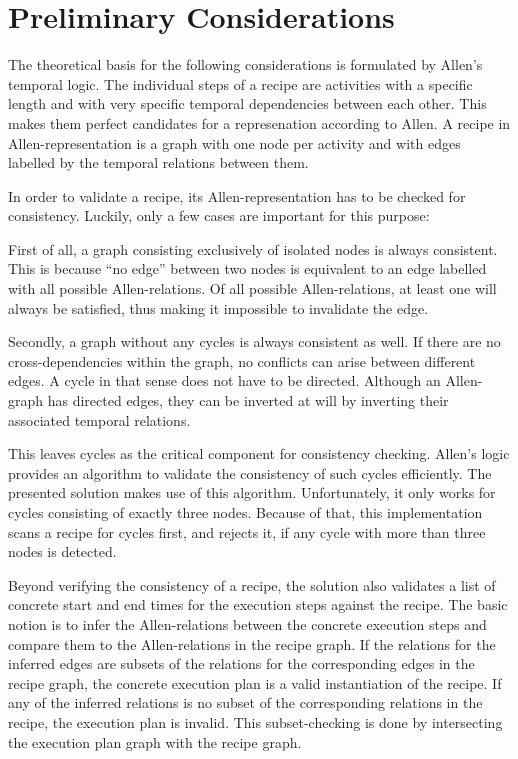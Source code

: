 \chapter{Preliminary Considerations}

    The theoretical basis for the following considerations is formulated
    by Allen's temporal logic. The individual steps of a recipe are activities
    with a specific length and with very specific temporal dependencies between each other. This
    makes them perfect candidates for a represenation according to Allen. A
    recipe in Allen-representation is a graph with one node per activity and with edges
    labelled by the temporal relations between them.
    
    In order to validate a recipe, its Allen-representation has to be checked
    for consistency. Luckily, only a few cases are important for this purpose:
    
    First of all, a graph consisting exclusively of isolated nodes
    is always consistent. This is because ``no edge'' between two nodes is equivalent to
    an edge labelled with all possible Allen-relations. Of all possible
    Allen-relations, at least one will always be satisfied, thus making it
    impossible to invalidate the edge.
    
    Secondly, a graph without any cycles is always consistent as well. If there
    are no cross-dependencies within the graph, no conflicts can arise between
    different edges. A cycle in that sense does not have to be directed.
    Although an Allen-graph has directed edges, they can be inverted at will by
    inverting their associated temporal relations.
    
    This leaves cycles as the critical component for consistency checking.
    Allen's logic provides an algorithm to validate the consistency of such
    cycles efficiently. The presented solution makes use of this
    algorithm. Unfortunately, it only works for cycles consisting of exactly
    three nodes. Because of that, this implementation scans a recipe for cycles
    first, and rejects it, if any cycle with more than three nodes is detected.
    
    Beyond verifying the consistency of a recipe, the solution also validates a
    list of concrete start and end times for the execution steps against the
    recipe. The basic notion is to infer the Allen-relations between the
    concrete execution steps and compare them to the Allen-relations in the
    recipe graph. If the relations for the inferred edges are subsets of the
    relations for the corresponding edges in the recipe graph, the concrete
    execution plan is a valid instantiation of the recipe. If any of the
    inferred relations is no subset of the corresponding relations in the
    recipe, the execution plan is invalid. This subset-checking is done by
    intersecting the execution plan graph with the recipe graph.
    

